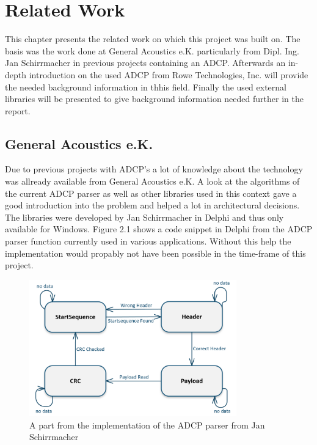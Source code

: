 \chapter{Related Work}
This chapter presents the related work on which this project was built on. The basis was the work done at General Acoustics e.K. particularly from Dipl. Ing. Jan Schirrmacher in previous projects containing an ADCP. Afterwards an in-depth introduction on the used ADCP from Rowe Technologies, Inc. will provide the needed background information in thhis field. Finally the used external libraries will be presented to give background information needed further in the report.

\section{General Acoustics e.K.}
Due to previous projects with ADCP's a lot of knowledge about the technology was allready available from General Acoustics e.K. A look at the algorithms of the current ADCP parser as well as other libraries used in this context gave a good introduction into the problem and helped a lot in architectural decisions. The libraries were developed by Jan Schirrmacher in Delphi and thus only available for Windows. Figure 2.1 shows a code snippet in Delphi from the ADCP parser function currently used in various applications. Without this help the implementation would propably not have been possible in the time-frame of this project.
\begin{figure}[b]
\centering
      \includegraphics[width=0.8\textwidth]{parser}
        \caption{A part from the implementation of the ADCP parser from Jan Schirrmacher}
\end{figure}

